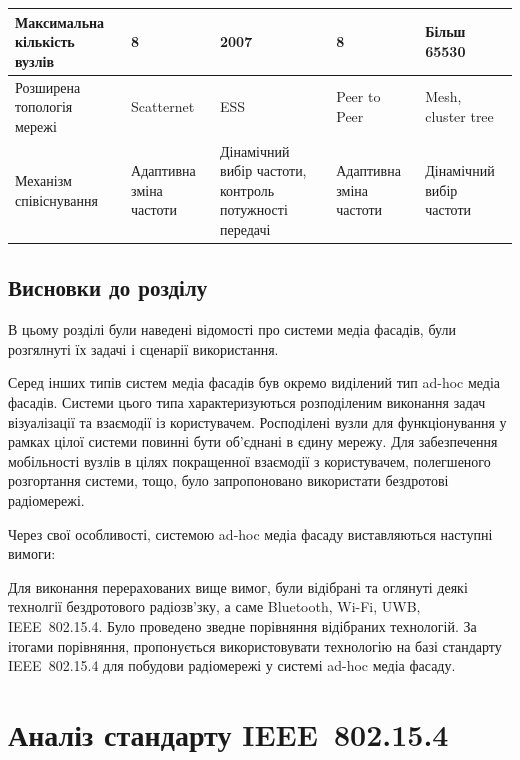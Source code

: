 \documentclass[a4paper,ukrainian,utf8,nocolumnsxix,floatsection]{eskdtext}
\let\stdsection\section
\renewcommand\section{\clearpage\stdsection}
\newcommand{\todoi}[1]{\todo[inline]{#1}}
\newcommand{\iee}[0]{IEEE~802.15.4\xspace}
\begin{document}
\begin{table}[htbp]
\begin{tabular}{|p{}|p{}|p{}|p{}|p{}|}
Максимальна кількість вузлів           & 8                       & 2007                                                   & 8                       & Більш 65530              \\ \hline
Розширена топологія мережі             & Scatternet              & ESS                                                    & Peer to Peer            & Mesh, cluster tree       \\ \hline
Механізм співіснування                 & Адаптивна зміна частоти & Дінамічний вибір частоти, контроль потужності передачі & Адаптивна зміна частоти & Дінамічний вибір частоти \\ \hline

\end{tabular}

\label{tbl:wireless_tech_comparison}

\end{table}

\todoi{full diapasons}


\subsection{Висновки до розділу}

В цьому розділі були наведені відомості про системи медіа фасадів, були розгялнуті їх задачі і сценарії використання. 

Серед інших типів систем медіа фасадів був окремо виділений тип ad-hoc медіа фасадів. Системи цього типа характеризуються розподіленим виконання задач візуалізації та взаємодії із користувачем. Росподілені вузли для функціонування у рамках цілої системи повинні бути об’єднані в єдину мережу. Для забезпечення мобільності вузлів в цілях покращенної взаємодії з користувачем, полегшеного розгортання системи, тощо, було запропоновано використати бездротові радіомережі.

Через свої особливості, системою ad-hoc медіа фасаду виставляються наступні вимоги:\todo{}

Для виконання перерахованих вище вимог, були відібрані та оглянуті деякі технолгії бездротового радіозв’зку, а саме Bluetooth, Wi-Fi, UWB, \iee. Було проведено зведне порівняння відібраних технологій. За ітогами порівняння, пропонується використовувати технологію на базі стандарту \iee для побудови радіомережі у системі ad-hoc медіа фасаду. 



\section{Аналіз стандарту \iee}
\end{document}
